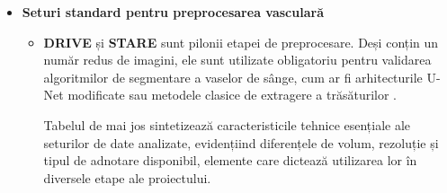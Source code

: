 \documentclass[12pt, a4paper, twoside, romanian]{teza-upb}
\begin{document}
\begin{itemize}
  \item \textbf{Seturi standard pentru preprocesarea vasculară}
  
        \begin{itemize}
          \item \textbf{DRIVE} \cite{13_staal2004ridge} și \textbf{STARE} \cite{9_chetoui2020explainable} sunt pilonii etapei de preprocesare.
                Deși conțin un număr redus de imagini, ele sunt utilizate obligatoriu pentru validarea algoritmilor de
                segmentare a vaselor de sânge, cum ar fi arhitecturile U-Net modificate \cite{12_sambyal2020modified} sau metodele clasice de
                extragere a trăsăturilor \cite{1_niemeijer2005automatic}.

                Tabelul de mai jos sintetizează caracteristicile tehnice esențiale ale seturilor de date analizate,
                evidențiind diferențele de volum, rezoluție și tipul de adnotare disponibil, elemente care dictează
                utilizarea lor în diversele etape ale proiectului.


\end{itemize}
\end{itemize}
\end{document}
